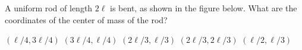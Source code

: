 \documentclass{../../../oss-classkick-exam}
\begin{document}
\genheader


\genmultidirections

\gengravity

\raggedcolumns
\begin{multicols*}{2}
  \begin{questions}

%    

    \question A uniform rod of length $2\ell$ is bent, as shown in the figure
    below. What are the coordinates of the center of mass of the rod?
    \begin{center}
    \end{center}
    \begin{choices}
      \choice $(\ell/4,3\ell/4)$
      \correctchoice $(3\ell/4,\ell/4)$
      \choice $(2\ell/3,\ell/3)$
      \choice $(2\ell/3,2\ell/3)$
      \choice $(\ell/2,\ell/3)$
    \end{choices}


\end{questions}
\end{multicols*}
\end{document}
